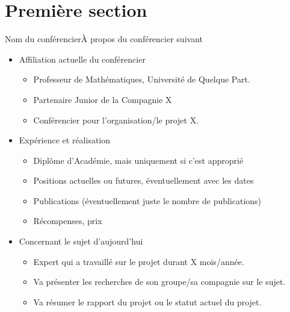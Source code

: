 

\section{Première section}

\begin{frame}{Nom du conférencier}{À propos du conférencier suivant}

  \begin{itemize}
  \item
    Affiliation actuelle du conférencier

    \begin{itemize}
    \item
      Professeur de Mathématiques, Université de Quelque Part.
    \item
      Partenaire Junior de la Compagnie X
    \item
      Conférencier pour l'organisation/le projet X.
    \end{itemize}
  \item
    Expérience et réalisation

    \begin{itemize}
    \item
      Diplôme d'Académie, mais uniquement si c'est approprié
    \item
      Positions actuelles ou futures, éventuellement avec les dates
    \item
      Publications (éventuellement juste le nombre de publications)
    \item
      Récompenses, prix
    \end{itemize}
  \item
    Concernant le sujet d'aujourd'hui

    \begin{itemize}
    \item
      Expert qui a travaillé sur le projet durant X mois/année.
    \item
      Va présenter les recherches de son groupe/sa compagnie sur le
      sujet.
    \item
      Va résumer le rapport du projet ou le statut actuel du projet.
    \end{itemize}
  \end{itemize}
\end{frame}